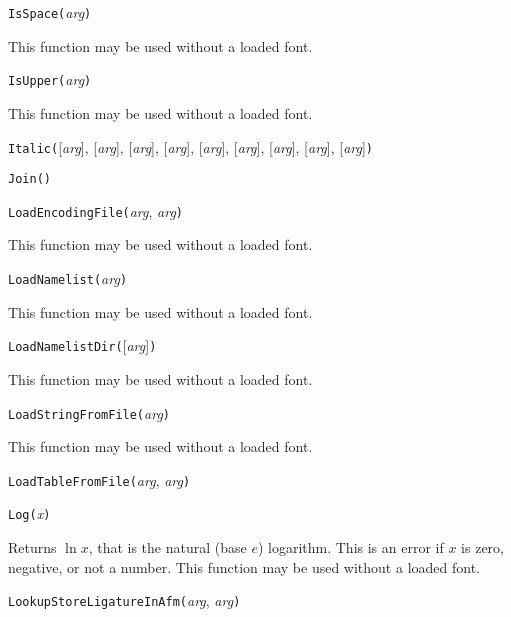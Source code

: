 
\noindent\texttt{IsSpace(}\textit{arg}\texttt{)}

This function may be used without a loaded font.


\noindent\texttt{IsUpper(}\textit{arg}\texttt{)}

This function may be used without a loaded font.


\noindent\texttt{Italic(}[\textit{arg}], [\textit{arg}], [\textit{arg}], [\textit{arg}], [\textit{arg}], [\textit{arg}], [\textit{arg}], [\textit{arg}], [\textit{arg}]\texttt{)}


\noindent\texttt{Join(}\texttt{)}


\noindent\texttt{LoadEncodingFile(}\textit{arg}, \textit{arg}\texttt{)}

This function may be used without a loaded font.


\noindent\texttt{LoadNamelist(}\textit{arg}\texttt{)}

This function may be used without a loaded font.


\noindent\texttt{LoadNamelistDir(}[\textit{arg}]\texttt{)}

This function may be used without a loaded font.


\noindent\texttt{LoadStringFromFile(}\textit{arg}\texttt{)}

This function may be used without a loaded font.


\noindent\texttt{LoadTableFromFile(}\textit{arg}, \textit{arg}\texttt{)}


\noindent\texttt{Log(}\textit{x}\texttt{)}

Returns $\ln x$, that is the natural (base $e$) logarithm.  This is an error
if $x$ is zero, negative, or not a number.
This function may be used without a loaded font.


\noindent\texttt{LookupStoreLigatureInAfm(}\textit{arg}, \textit{arg}\texttt{)}

